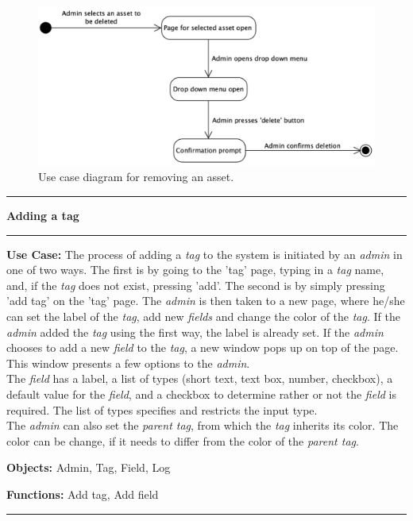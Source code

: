 \begin{figure}[H]
    \centering
    \includegraphics[width=1.0\textwidth]{figures/RemoveAsset.png}
    \caption{Use case diagram for removing an asset.}
    \label{fig:UseCaseRemoveAsset}
\end{figure}


\begin{use_case}[H]
    \hrule
    \vskip 0.3cm
    \Large
    \begin{center}
    
        \textbf{Adding a tag}
        
    \end{center}
    \vskip 0.1cm
    \hrule
    \vskip 0.2cm
    \normalsize
    
    \textbf{Use Case:} The process of adding a \textit{tag} to the system is initiated by an \textit{admin} in one of two ways. The first is by going to the 'tag' page, typing in a \textit{tag} name, and, if the \textit{tag} does not exist, pressing 'add'. The second is by simply pressing 'add tag' on the 'tag' page. The \textit{admin} is then taken to a new page, where he/she can set the label of the \textit{tag}, add new \textit{fields} and change the color of the \textit{tag}. If the \textit{admin} added the \textit{tag} using the first way, the label is already set. If the \textit{admin} chooses to add a new \textit{field} to the \textit{tag}, a new window pops up on top of the page. This window presents a few options to the \textit{admin}.\\
    The \textit{field} has a label, a list of types (short text, text box, number, checkbox), a default value for the \textit{field}, and a checkbox to determine rather or not the \textit{field} is required. The list of types specifies and restricts the input type.\\
    The \textit{admin} can also set the \textit{parent tag}, from which the \textit{tag} inherits its color. The color can be change, if it needs to differ from the color of the \textit{parent tag}.
    
    \vskip 0.2cm
    
    \textbf{Objects:} Admin, Tag, Field, Log
    
    \vskip 0.2cm
    
    \textbf{Functions:} Add tag, Add field
    
    \vskip 0.4cm
    \hrule
    \vskip 0.2cm
    \caption{Adding a tag} \label{use_case:adding_a_tag}
\end{use_case}

